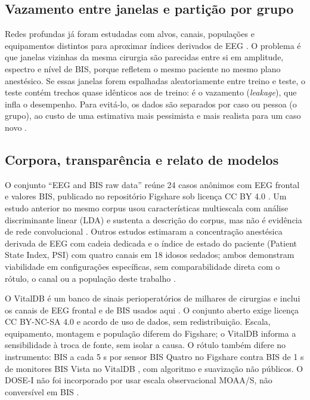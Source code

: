 \documentclass[12pt]{article}
\begin{document}
\subsection{Vazamento entre janelas e partição por grupo}

Redes profundas já foram estudadas com alvos, canais, populações e equipamentos distintos para aproximar índices derivados de EEG \cite{park2020,shi2023}. O problema é que janelas vizinhas da mesma cirurgia são parecidas entre si em amplitude, espectro e nível de BIS, porque refletem o mesmo paciente no mesmo plano anestésico. Se essas janelas forem espalhadas aleatoriamente entre treino e teste, o teste contém trechos quase idênticos aos de treino: é o vazamento (\textit{leakage}), que infla o desempenho. Para evitá-lo, os dados são separados por caso ou pessoa (o grupo), ao custo de uma estimativa mais pessimista e mais realista para um caso novo \cite{sukriti2026,saeb2017}.

\subsection{Corpora, transparência e relato de modelos}

O conjunto ``EEG and BIS raw data'' reúne 24 casos anônimos com EEG frontal e valores BIS, publicado no repositório Figshare sob licença CC BY 4.0 \cite{ma2017}. Um estudo anterior no mesmo corpus usou características multiescala com análise discriminante linear (LDA) e sustenta a descrição do corpus, mas não é evidência de rede convolucional \cite{nsugbe2022}. Outros estudos estimaram a concentração anestésica derivada de EEG com cadeia dedicada e o índice de estado do paciente (Patient State Index, PSI) com quatro canais em 18 idosos sedados; ambos demonstram viabilidade em configurações específicas, sem comparabilidade direta com o rótulo, o canal ou a população deste trabalho \cite{park2020,shi2023}.

O VitalDB é um banco de sinais perioperatórios de milhares de cirurgias e inclui os canais de EEG frontal e de BIS usados aqui \cite{lee2022,vitaldb}. O conjunto aberto exige licença CC BY-NC-SA 4.0 e acordo de uso de dados, sem redistribuição. Escala, equipamento, montagem e população diferem do Figshare; o VitalDB informa a sensibilidade à troca de fonte, sem isolar a causa. O rótulo também difere no instrumento: BIS a cada 5 s por sensor BIS Quatro no Figshare \cite{ma2017,sukriti2026} contra BIS de 1 s de monitores BIS Vista no VitalDB \cite{vitaldb,lee2022}, com algoritmo e suavização não públicos. O DOSE-I não foi incorporado por usar escala observacional MOAA/S, não conversível em BIS \cite{dosei}.
\end{document}
